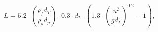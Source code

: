 \begin{equation}
\label{eq:racewaypenetration}
L = 5.2 \cdot \left(\frac{\rho_f d_T}{\rho_s d_p} \right) \cdot 0.3 \cdot d_T
\cdot (1.3 \cdot \left(\frac{u^2}{g d_T} \right)^{0.2} - 1), 
\end{equation}
